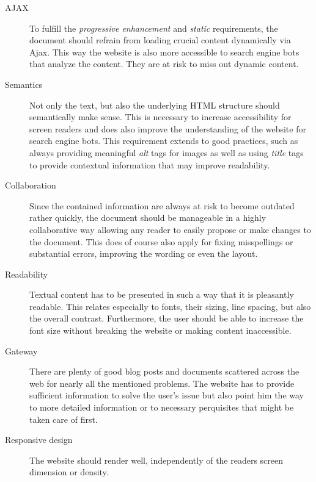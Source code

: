 \begin{description}
	\item[\ac{AJAX}]\hfill

	To fulfill the \textit{progressive enhancement} and \textit{static} requirements, the document should refrain from loading crucial content dynamically via \ac{Ajax}. This way the website is also more accessible to search engine bots that analyze the content. They are at risk to miss out dynamic content.

	\item[Semantics]\hfill

	Not only the text, but also the underlying \ac{HTML} structure should semantically make sense. This is necessary to increase accessibility for screen readers and does also improve the understanding of the website for search engine bots. This requirement extends to good practices, such as always providing meaningful \textit{alt} tags for images as well as using \textit{title} tags to provide contextual information that may improve readability.

	\item[Collaboration]\hfill

	Since the contained information are always at risk to become outdated rather quickly, the document should be manageable in a highly collaborative way allowing any reader to easily propose or make changes to the document. This does of course also apply for fixing misspellings or substantial errors, improving the wording or even the layout.

	\item[Readability]\hfill

	Textual content has to be presented in such a way that it is pleasantly readable. This relates especially to fonts, their sizing, line spacing, but also the overall contrast. Furthermore, the user should be able to increase the font size without breaking the website or making content inaccessible.

	\item[Gateway]\hfill

	There are plenty of good blog posts and documents scattered across the web for nearly all the mentioned problems. The website has to provide sufficient information to solve the user's issue but also point him the way to more detailed information or to necessary perquisites that might be taken care of first.

	\item[Responsive design]\hfill

	The website should render well, independently of the readers screen dimension or density.


\end{description}
